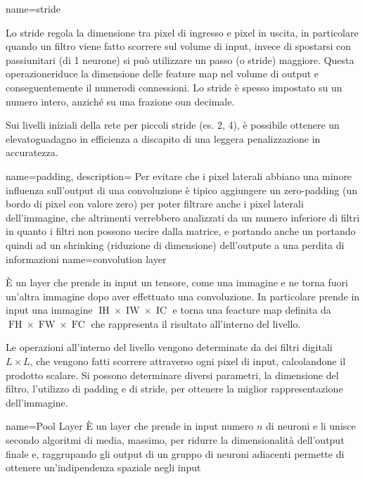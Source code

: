 {
    name=stride} {Lo stride regola la dimensione tra pixel di ingresso e pixel in uscita, in particolare quando un filtro viene fatto scorrere sul volume di input, invece di spostarsi con passiunitari (di 1 neurone) si può utilizzare un passo (o stride) maggiore. Questa operazioneriduce la dimensione delle feature map nel volume di output e conseguentemente il numerodi connessioni. Lo stride è spesso impostato su un numero intero, anziché su una frazione oun decimale.

    Sui livelli iniziali della rete per piccoli stride (es. 2, 4), è possibile ottenere un elevatoguadagno in eﬀicienza a discapito di una leggera penalizzazione in accuratezza.}

 {
    name=padding,
    description= {Per evitare che i pixel laterali abbiano una minore influenza sull'output di una convoluzione è tipico aggiungere un zero-padding (un bordo di pixel con valore zero) per poter filtrare anche i pixel laterali dell’immagine, che altrimenti verrebbero analizzati da un numero inferiore di filtri in quanto i filtri non possono uscire dalla matrice, e portando anche un portando quindi ad un shrinking (riduzione di dimensione) dell’outpute a una perdita di informazioni}
}
{
    name={convolution layer}}{
    È un layer che prende in input un tensore, come una immagine e ne torna fuori un’altra immagine dopo aver effettuato una \gls{convoluzione}. In particolare prende in input una immagine \(\operatorname{IH} \times \operatorname{IW} \times \operatorname{IC}\) e torna una feacture map definita da \(\operatorname{FH} \times \operatorname{FW} \times \operatorname{FC}\) che rappresenta il risultato all'interno del livello. 
    
    Le operazioni all’interno del livello vengono determinate da dei filtri digitali \(L \times L\), che vengono fatti scorrere attraverso
    ogni pixel di input, calcolandone il prodotto scalare. Si possono determinare diversi
    parametri, la dimensione del filtro, l’utilizzo di \gls{padding} e di \gls{stride}, per ottenere la miglior rappresentazione dell’immagine.} 

{
    name={Pool Layer}}{
    È un layer che prende in input numero \(n\) di neuroni e li unisce secondo algoritmi di
    media, massimo, per ridurre la dimensionalità dell’output finale e, raggrupando gli
    output di un gruppo di neuroni adiacenti permette di ottenere un’indipendenza spaziale
    negli input}

